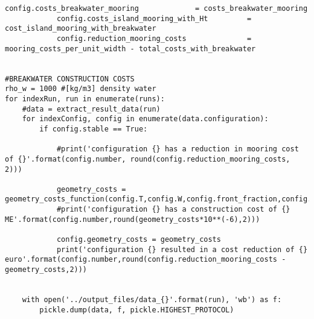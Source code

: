 \begin{mdframed}[backgroundcolor=light-gray, roundcorner=10pt,leftmargin=1, rightmargin=1, innerleftmargin=0, innertopmargin=7,innerbottommargin=0, outerlinewidth=1, linecolor=light-gray]
\begin{lstlisting}[linewidth=\columnwidth,caption=Costs post-processing ., label=script:Costs post-processing]
            config.costs_breakwater_mooring             = costs_breakwater_mooring
            config.costs_island_mooring_with_Ht         = cost_island_mooring_with_breakwater
            config.reduction_mooring_costs              = mooring_costs_per_unit_width - total_costs_with_breakwater


#BREAKWATER CONSTRUCTION COSTS
rho_w = 1000 #[kg/m3] density water
for indexRun, run in enumerate(runs):
    #data = extract_result_data(run)
    for indexConfig, config in enumerate(data.configuration):
        if config.stable == True:

            #print('configuration {} has a reduction in mooring cost of {}'.format(config.number, round(config.reduction_mooring_costs, 2)))

            geometry_costs = geometry_costs_function(config.T,config.W,config.front_fraction,config.top_fraction,config.verschuiving,config.WL,config.mass,config.h,config.x)
            #print('configuration {} has a construction cost of {} ME'.format(config.number,round(geometry_costs*10**(-6),2)))

            config.geometry_costs = geometry_costs
            print('configuration {} resulted in a cost reduction of {} euro'.format(config.number,round(config.reduction_mooring_costs - geometry_costs,2)))


    with open('../output_files/data_{}'.format(run), 'wb') as f:
        pickle.dump(data, f, pickle.HIGHEST_PROTOCOL)




    
\end{lstlisting}
\end{mdframed}


